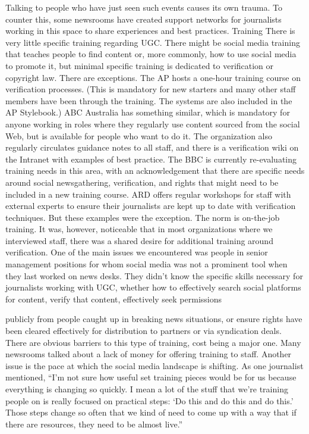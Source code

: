\begin{enumerate}
Talking to people who have just seen such events causes its own trauma. To
counter this, some newsrooms have created support networks for journalists
working in this space to share experiences and best practices.
Training
There is very little specific training regarding UGC. There might be social
media training that teaches people to find content or, more commonly,
how to use social media to promote it, but minimal specific training is
dedicated to verification or copyright law. There are exceptions. The AP
hosts a one-hour training course on verification processes. (This is mandatory
for new starters and many other staff members have been through the
training. The systems are also included in the AP Stylebook.) ABC Australia
has something similar, which is mandatory for anyone working in roles
where they regularly use content sourced from the social Web, but is available
for people who want to do it. The organization also regularly circulates
guidance notes to all staff, and there is a verification wiki on the Intranet
with examples of best practice. The BBC is currently re-evaluating training
needs in this area, with an acknowledgement that there are specific needs
around social newsgathering, verification, and rights that might need to be
included in a new training course. ARD offers regular workshops for staff
with external experts to ensure their journalists are kept up to date with
verification techniques.
But these examples were the exception. The norm is on-the-job training. It
was, however, noticeable that in most organizations where we interviewed
staff, there was a shared desire for additional training around verification.
One of the main issues we encountered was people in senior management
positions for whom social media was not a prominent tool when they last
worked on news desks. They didn't know the specific skills necessary for
journalists working with UGC, whether how to effectively search social
platforms for content, verify that content, effectively seek permissions

publicly from people caught up in breaking news situations, or ensure
rights have been cleared effectively for distribution to partners or via
syndication deals.
There are obvious barriers to this type of training, cost being a major one.
Many newsrooms talked about a lack of money for offering training to staff.
Another issue is the pace at which the social media landscape is shifting.
As one journalist mentioned, ``I'm not sure how useful set training pieces
would be for us because everything is changing so quickly. I mean a lot of
the stuff that we're training people on is really focused on practical steps:
‘Do this and do this and do this.' Those steps change so often that we kind
of need to come up with a way that if there are resources, they need to be
almost live.''

\end{enumerate}
